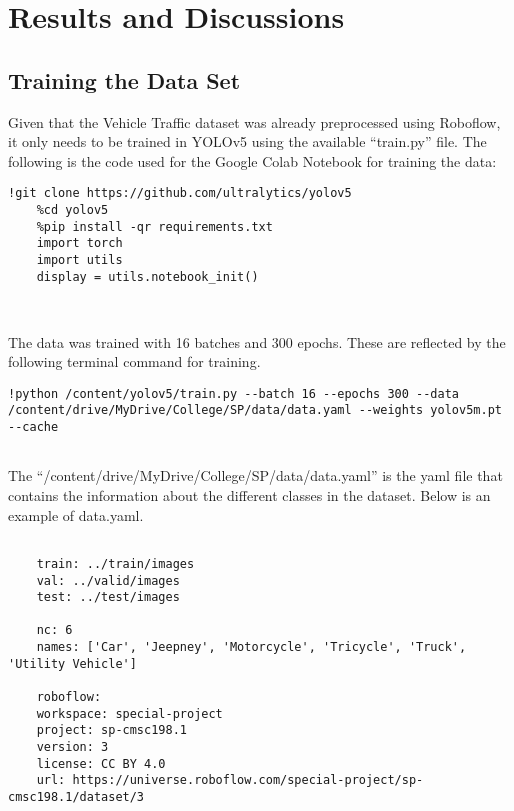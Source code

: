 \chapter{Results and Discussions}

\section{Training the Data Set}

Given that the Vehicle Traffic dataset was already preprocessed using Roboflow, it only needs to be trained in YOLOv5 using the available “train.py” file. The following is the code used for the Google Colab Notebook for training the data:


\begin{lstlisting}[frame=single]
	!git clone https://github.com/ultralytics/yolov5
	%cd yolov5
	%pip install -qr requirements.txt
	import torch
	import utils
	display = utils.notebook_init()

	
\end{lstlisting}

The data was trained with 16 batches and 300 epochs. These are reflected by the following terminal command for training.


\begin{lstlisting}[frame=single]
		!python /content/yolov5/train.py --batch 16 --epochs 300 --data /content/drive/MyDrive/College/SP/data/data.yaml --weights yolov5m.pt --cache
		
\end{lstlisting}



\newpage

The “/content/drive/MyDrive/College/SP/data/data.yaml” is the yaml file that contains the information about the different classes in the dataset. Below is an example of data.yaml.


\begin{lstlisting}[frame=single]
	
	train: ../train/images
	val: ../valid/images
	test: ../test/images
	
	nc: 6
	names: ['Car', 'Jeepney', 'Motorcycle', 'Tricycle', 'Truck', 'Utility Vehicle']
	
	roboflow:
	workspace: special-project
	project: sp-cmsc198.1
	version: 3
	license: CC BY 4.0
	url: https://universe.roboflow.com/special-project/sp-cmsc198.1/dataset/3
	
	
\end{lstlisting}

